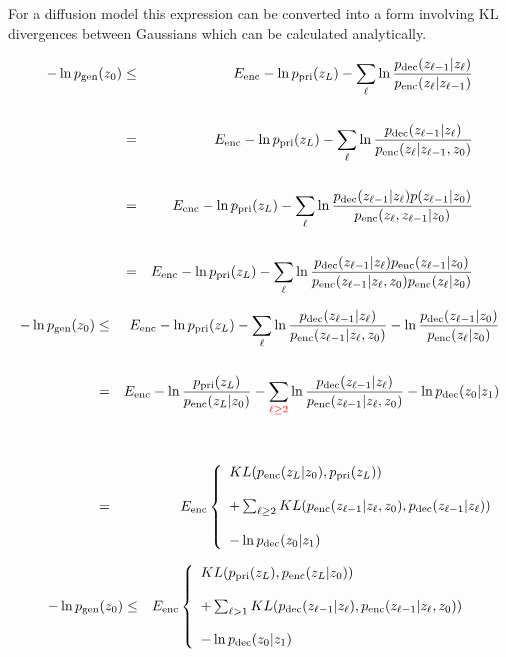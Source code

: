 {\vfill
For a diffusion model this expression can be converted into a form involving KL divergences between Gaussians which can be calculated analytically.


{\huge
\begin{eqnarray*}
- \ln p_{\mathrm{gen}}(z_0) & \leq & E_{\mathrm{enc}} -\ln p_{\mathrm{pri}}(z_L) - \sum_{\ell } \ln \frac{p_{\mathrm{dec}}(z_{\ell-1}|z_\ell)}{p_{\mathrm{enc}}(z_\ell|z_{\ell-1})} \\
\\
& = & E_{\mathrm{enc}} -\ln p_{\mathrm{pri}}(z_L) - \sum_{\ell } \ln \frac{p_{\mathrm{dec}}(z_{\ell-1}|z_\ell)}{p_{\mathrm{enc}}(z_\ell|z_{\ell-1},z_0)} \\
\\
& = & E_{\mathrm{enc}} -\ln p_{\mathrm{pri}}(z_L) - \sum_{\ell } \ln \frac{p_{\mathrm{dec}}(z_{\ell-1}|z_\ell)p(z_{\ell-1}|z_0)}{p_{\mathrm{enc}}(z_\ell,z_{\ell-1}|z_0)} \\
\\
& = & E_{\mathrm{enc}} -\ln p_{\mathrm{pri}}(z_L) - \sum_{\ell } \ln \frac{p_{\mathrm{dec}}(z_{\ell-1}|z_\ell)p_{\mathrm{enc}}(z_{\ell-1}|z_0)}{p_{\mathrm{enc}}(z_{\ell-1}|z_\ell,z_0)p_{\mathrm{enc}}(z_\ell|z_0)}
\end{eqnarray*}
}



{\huge
\begin{eqnarray*}
- \ln p_{\mathrm{gen}}(z_0) & \leq & E_{\mathrm{enc}} -\ln p_{\mathrm{pri}}(z_L) - \sum_{\ell } \ln \frac{p_{\mathrm{dec}}(z_{\ell-1}|z_\ell)}{p_{\mathrm{enc}}(z_{\ell-1}|z_\ell,z_0)}
- \ln \frac{p_{\mathrm{dec}}(z_{\ell-1}|z_0)}{p_{\mathrm{enc}}(z_\ell|z_0)} \\
\\
& = & E_{\mathrm{enc}} -\ln \frac{p_{\mathrm{pri}}(z_L)}{p_{\mathrm{enc}}(z_L|z_0)} - \sum_{\color{red} \ell \geq 2} \ln \frac{p_{\mathrm{dec}}(z_{\ell-1}|z_\ell)}{p_{\mathrm{enc}}(z_{\ell-1}|z_\ell,z_0)} - \ln p_{\mathrm{dec}}(z_0|z_1) \\
\\
\\
& = & E_{\mathrm{enc}} \left\{\begin{array}{l}KL(p_{\mathrm{enc}}(z_L|z_0),p_{\mathrm{pri}}(z_L)) \\
\\
+ \sum_{\ell \geq 2} KL(p_{\mathrm{enc}}(z_{\ell-1}|z_\ell,z_0),p_{\mathrm{dec}}(z_{\ell-1}|z_\ell)) \\
\\
- \ln p_{\mathrm{dec}}(z_0|z_1) \end{array} \right.
\end{eqnarray*}
}



{\huge
\begin{eqnarray*}
- \ln p_{\mathrm{gen}}(z_0) & \leq &
E_{\mathrm{enc}} \left\{\begin{array}{l}KL(p_{\mathrm{pri}}(z_L),p_{\mathrm{enc}}(z_L|z_0)) \\
\\
+ \sum_{\ell > 1} KL(p_{\mathrm{dec}}(z_{\ell-1}|z_\ell),p_{\mathrm{enc}}(z_{\ell-1}|z_\ell,z_0)) \\
\\
- \ln p_{\mathrm{dec}}(z_0|z_1) \end{array} \right.
\end{eqnarray*}
}

}

